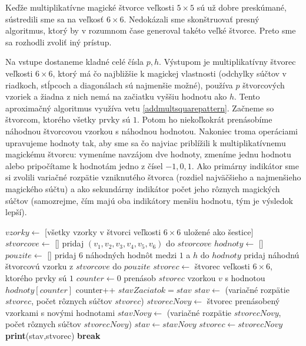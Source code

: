 Keďže multiplikatívne magické štvorce veľkosti $5 \times 5$ sú už dobre preskúmané, sústredili sme sa na veľkosť $6 \times 6$. Nedokázali sme skonštruovať presný algoritmus, ktorý by v rozumnom čase generoval takéto veľké štvorce. Preto sme sa rozhodli zvoliť iný prístup.

\begin{alg}
\label{algsquare6x6mm}
Na vstupe dostaneme kladné celé čísla $p, h$. Výstupom je multiplikatívny štvorec veľkosti $6 \times 6$, ktorý má čo najbližšie k magickej vlastnosti (odchylky súčtov v riadkoch, stĺpcoch a diagonálach sú najmenšie možné), používa $p$ štvorcových vzoriek a žiadna z nich nemá na začiatku vyššiu hodnotu ako $h$. Tento aproximačný algoritmus využíva vetu \ref{addmultsquarepattern}. Začneme so štvorcom, ktorého všetky prvky sú $1$. Potom ho niekoľkokrát prenásobíme náhodnou štvorcovou vzorkou s náhodnou hodnotou. Nakoniec troma operáciami upravujeme hodnoty tak, aby sme sa čo najviac priblížili k multiplikatívnemu magickému štvorcu: vymeníme navzájom dve hodnoty, zmeníme jednu hodnotu alebo pripočítame k hodnotám jedno z čísel $-1, 0, 1$. Ako primárny indikátor sme si zvolili variačné rozpätie vzniknutého štvorca (rozdiel najväčšieho a najmenšieho magického súčtu) a ako sekundárny indikátor počet jeho rôznych magických súčtov (samozrejme, čím majú oba indikátory menšiu hodnotu, tým je výsledok lepší).
\end{alg}

\begin{algorithmic}
\STATE $vzorky \gets$ [všetky vzorky v štvorci veľkosti $6 \times 6$ uložené ako šestice]
\STATE $stvorcove \gets $ []
	\STATE pridaj $(v_1,v_2,v_3,v_4,v_5,v_6)$ do $stvorcove$
    \ENDIF
\ENDFOR
{}
	\STATE $hodnoty \gets$ []
	\STATE $pouzite \gets$ []
		\STATE pridaj $6$ náhodných hodnôt medzi $1$ a $h$ do $hodnoty$
		\STATE pridaj náhodnú štvorcovú vzorku z $stvorcove$ do $pouzite$
	\ENDFOR
		\STATE $stvorec \gets$ štvorec veľkosti $6 \times 6$, ktorého prvky sú $1$
		\STATE $counter \gets 0$
				\STATE prenásob $stvorec$ vzorkou $v$ s hodnotou $hodnoty[counter]$
				\STATE counter++
			\ENDFOR
		\ENDFOR
			\STATE $stavZaciatok = stav$
			\STATE $stav \gets$ (variačné rozpätie $stvorec$, počet rôznych súčtov $stvorec$)
				\STATE $stvorecNovy \gets$ štvorec prenásobený vzorkami s novými hodnotami
				\STATE $stavNovy \gets$ (variačné rozpätie $stvorecNovy$, počet rôznych súčtov $stvorecNovy$)
					\STATE $stav \gets stavNovy$
					\STATE $stvorec \gets stvorecNovy$
				\ENDIF
			\ENDFOR
				\STATE \textbf{print}(stav,stvorec)
				\STATE \textbf{break}
			\ENDIF
		\ENDIF
	\ENDWHILE
\ENDWHILE
\end{algorithmic}

